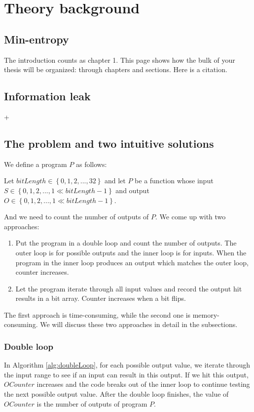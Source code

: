 \chapter{Theory background}
	\label{CH_02}

\section{Min-entropy}
The introduction counts as chapter 1.  This page shows how the bulk of your thesis will be organized: through chapters and sections. Here is a citation.\cite{OBTMBD01}

\section{Information leak}
+


\section{The problem and two intuitive solutions}
We define a program $P$ as follows:
\begin{mydef}
Let $bitLength\in \left\{ {0,1,2,..., 32}\right\}$ and let $P$ be a function whose input $S \in \left\{ {0,1,2,..., 1\ll bitLength-1}\right\}$ and output $O \in \left\{ {0,1,2,..., 1\ll bitLength-1}\right\}$.
\end{mydef}

And we need to count the number of outputs of $P$. We come up with two approaches: 

\begin{enumerate}
\item Put the program in a double loop and count the number of outputs. The outer loop is for possible outputs and the inner loop is for inputs. When the program in the inner loop produces an output which matches the outer loop, counter increases.
\item Let the program iterate through all input values and record the output hit results in a bit array. Counter increases when a bit flips.
\end{enumerate}

The first approach is time-consuming, while the second one is memory-consuming. We will discuss these two approaches in detail in the subsections.

\subsection{Double loop}
In Algorithm \ref{alg:doubleLoop}, for each possible output value, we iterate through the input range to see if an input can result in this output. If we hit this output, $OCounter$ increases and the code breaks out of the inner loop to continue testing the next possible output value. After the double loop finishes, the value of $OCounter$ is the number of outputs of program $P$.

